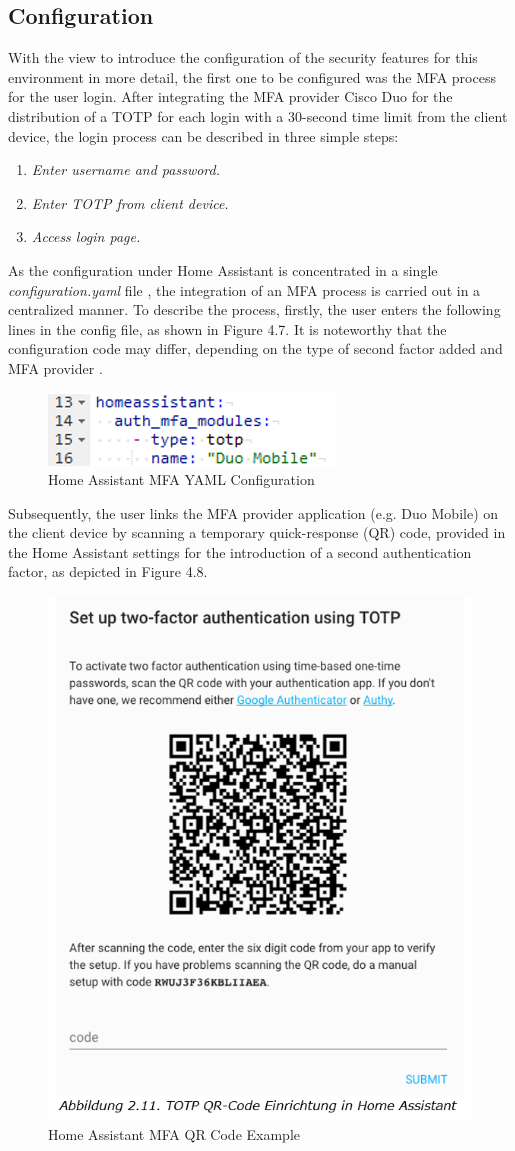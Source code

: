 \subsection{Configuration}
With the view to introduce the configuration of the security features for this environment in more detail, the first one to be configured was the MFA process for the user login. After integrating the MFA provider Cisco Duo for the distribution of a TOTP for each login with a 30-second time limit from the client device, the login process can be described in three simple steps:
\begin{enumerate}
    \item \textit{Enter username and password.}
    \item \textit{Enter TOTP from client device.}
    \item \textit{Access login page.}
\end{enumerate}

As the configuration under Home Assistant is concentrated in a single \textit{configuration.yaml} file \cite{rpi_ha_config}, the integration of an MFA process is carried out in a centralized manner. To describe the process, firstly, the user enters the following lines in the config file, as shown in Figure 4.7. It is noteworthy that the configuration code may differ, depending on the type of second factor added and MFA provider \cite{ha_mfa}.
\begin{figure}[H]
	\centering
	\includegraphics[width=0.4 \linewidth]{Images/K4/Picture8.png}
	\caption{Home Assistant MFA YAML Configuration}
	\label{fig:Rpi_config}
\end{figure}

Subsequently, the user links the MFA provider application (e.g. Duo Mobile) on the client device by scanning a temporary quick-response (QR) code, provided in the Home Assistant settings for the introduction of a second authentication factor, as depicted in Figure 4.8.
\begin{figure}[H]
	\centering
	\includegraphics[width=0.5 \linewidth]{Images/K4/Picture8-1.png}
	\caption{Home Assistant MFA QR Code Example}
	\label{fig:Rpi_qr}
\end{figure}

